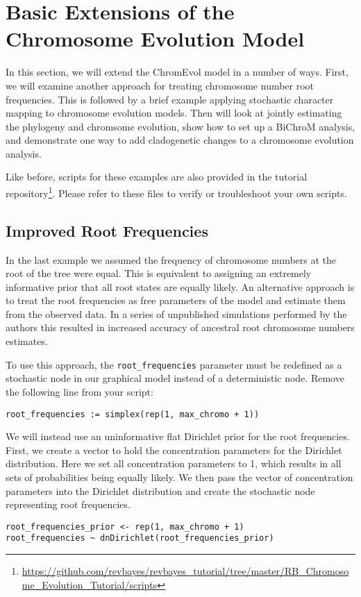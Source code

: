 \section{Basic Extensions of the Chromosome Evolution Model}\label{sec:chromo_extensions}

In this section, we will extend the ChromEvol model in a number of ways.
First, we will examine another approach for treating chromosome number root frequencies.
This is followed by a brief example applying stochastic character mapping to chromosome evolution
models.
Then will look at jointly estimating the phylogeny and chromsome evolution,
show how to set up a BiChroM analysis, and demonstrate one way to add cladogenetic changes
to a chromosome evolution analysis.

Like before, scripts for these examples are also provided in the \RevBayes tutorial repository\footnote{\url{https://github.com/revbayes/revbayes_tutorial/tree/master/RB_Chromosome_Evolution_Tutorial/scripts}}. 
Please refer to these files to verify or troubleshoot your own scripts. 

\bigskip
\subsection{Improved Root Frequencies}\label{subsect:root_freq}

In the last example we assumed the frequency of chromosome numbers at the root of the tree
were equal. This is equivalent to assigning an extremely informative prior that all root states
are equally likely.
An alternative approach is to treat the root frequencies
as free parameters of the model and estimate them from the observed data.
In a series of unpublished simulations performed by the authors this resulted in increased accuracy of 
ancestral root chromosome numbers estimates. 


To use this approach, the \texttt{root\_frequencies} parameter must be redefined
as a stochastic node in our graphical model instead of a deterministic node.
Remove the following line from your \Rev script:
{\tt \begin{snugshade*}
\begin{lstlisting}
root_frequencies := simplex(rep(1, max_chromo + 1))
\end{lstlisting}
\end{snugshade*}}

We will instead use an uninformative flat Dirichlet prior for the root frequencies.
First, we create a vector to hold the concentration parameters for the Dirichlet
distribution. Here we set all concentration parameters to 1, which results in all
sets of probabilities being equally likely.
We then pass the vector of concentration parameters into the Dirichlet distribution
and create the stochastic node representing root frequencies.
{\tt \begin{snugshade*}
\begin{lstlisting}
root_frequencies_prior <- rep(1, max_chromo + 1)
root_frequencies ~ dnDirichlet(root_frequencies_prior)
\end{lstlisting}
\end{snugshade*}}

